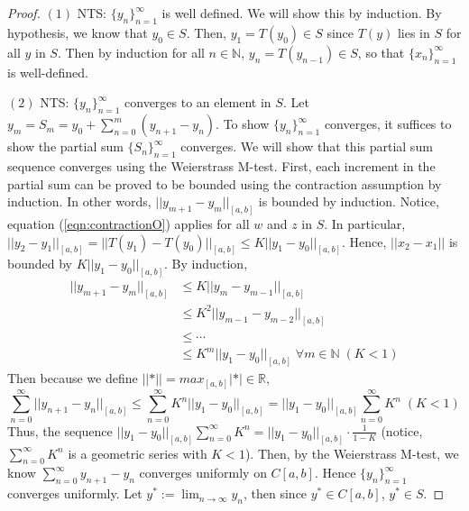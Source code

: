 \documentclass{article}
\theoremstyle{definition}
\theoremstyle{remark}
\theoremstyle{example}
\begin{document}
\begin{proof}
    \cite{r_kent_nagle_fundamentals_2011}$(1)$ NTS: $\{y_n\}_{n = 1}^{\infty}$ is well defined. \; We will show this by induction. By hypothesis, we know that $y_0 \in S$. Then, $y_1 = T(y_0) \in S$ since $T(y)$ lies in $S$ for all $y$ in $S$. Then by induction for all $n \in \mathbb{N}$, $y_n = T(y_{n-1}) \in S$, so that $\{x_n\}_{n = 1}^{\infty}$ is well-defined.
    
    $(2)$ NTS: $\{y_n\}_{n = 1}^{\infty}$ converges to an element in $S$. \; Let $y_m = S_m = y_0 + \sum_{n = 0}^{m}(y_{n+1} - y_n)$. To show $\{y_n\}_{n = 1}^{\infty}$ converges, it suffices to show the partial sum $\{S_n\}_{n = 1}^{\infty}$ converges. We will show that this partial sum sequence converges using the Weierstrass M-test. First, each increment in the partial sum can be proved to be bounded using the contraction assumption by induction. In other words, $\lvert\lvert y_{m+1} - y_{m}\rvert\rvert_{[a,b]}$ is bounded by induction. Notice, equation (\ref{eqn:contractionO}) applies for all $w$ and $z$ in $S$. In particular, $\lvert\lvert y_2 - y_1 \rvert\rvert_{[a,b]} = \lvert\lvert T(y_1) - T(y_0) \rvert\rvert_{[a,b]} \leq K \lvert\lvert y_1 - y_0 \rvert\rvert_{[a,b]}$. Hence, $\lvert\lvert x_2 - x_1 \rvert\rvert$ is bounded by $K \lvert\lvert y_1 - y_0 \rvert\rvert_{[a,b]}$. By induction,
    \begin{align}
        \lvert\lvert y_{m+1} - y_{m} \rvert\rvert_{[a,b]} &\leq K \lvert\lvert y_m - y_{m-1} \rvert\rvert_{[a,b]}\\
        &\leq K^2 \lvert\lvert y_{m-1} - y_{m-2} \rvert\rvert_{[a,b]}\\
        &\leq \cdots\\
        &\leq K^m\lvert\lvert y_1 - y_0 \rvert\rvert_{[a,b]} \; \forall m \in \mathbb{N} \; (K < 1)
    \end{align}
   Then because we define $\lvert\lvert * \rvert\rvert = max_{[a,b]}\lvert * \rvert \in \mathbb{R}$,
    \begin{equation}\label{eqn:comparison2}
        \sum_{n = 0}^{\infty}{\lvert\lvert y_{n+1} - y_n \rvert\rvert_{[a,b]}} \leq \sum_{n = 0}^{\infty}{K^n\lvert\lvert y_1 - y_0 \rvert\rvert_{[a,b]}} = \lvert\lvert y_1 - y_0 \rvert\rvert_{[a,b]} \sum_{n = 0}^{\infty}{K^n} \; (K < 1)
    \end{equation}
    Thus, the sequence $\lvert\lvert y_1 - y_0 \rvert\rvert_{[a,b]} \sum_{n = 0}^{\infty}{K^n} = \lvert\lvert y_1 - y_0 \rvert\rvert_{[a,b]} \cdot \tfrac{1}{1-K}$ (notice, $\sum_{n = 0}^{\infty}{K^n}$ is a geometric series with $K < 1$). Then, by the Weierstrass M-test, we know $\sum_{n = 0}^{\infty}{y_{n+1} - y_n}$ converges uniformly on $C[a,b]$. Hence $\{y_n\}_{n = 1}^{\infty}$ converges uniformly. Let $y^{*} := \lim_{n \to \infty}{y_n}$, then since $y^{*} \in C[a,b]$, $y^{*} \in S$.
    

\end{proof}
\end{document}
